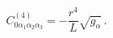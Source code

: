 \begin{equation}
C^{(4)}_{0\alpha_1\alpha_2\alpha_3}=-\frac{r^4}{L}\sqrt{g_\alpha}\, .
\end{equation}


